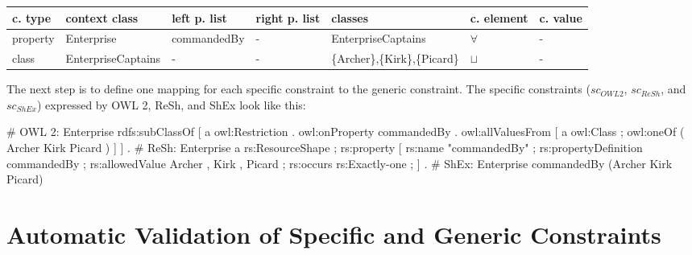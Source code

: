 \documentclass{llncs}
\newcommand{\ms}[1]{\texttt{#1}}
\newenvironment{gcotable}{
  \scriptsize
  \sffamily
  \vspace{0.3cm}
	\begin{center}
  \begin{tabular}{l|l|l|l|l|l|l}
  \hline
  \textbf{c. type} & \textbf{context class} & \textbf{left p. list} & \textbf{right p. list} & \textbf{classes} & \textbf{c. element} & \textbf{c. value} \\
  \hline

}{
  \hline
  \end{tabular}
	\end{center}
}
\begin{document}
\begin{gcotable}
property & Enterprise & commandedBy & - & EnterpriseCaptains & $\forall$ & - \\
class & EnterpriseCaptains & - & - & \{Archer\},\{Kirk\},\{Picard\} & $\sqcup$ & - \\
\end{gcotable}

The next step is to define one mapping for each specific constraint to the generic constraint.
The specific constraints (\ms{$sc_{OWL 2}$}, \ms{$sc_{ReSh}$}, and \ms{$sc_{ShEx}$}) expressed by OWL 2, ReSh, and ShEx look like this:

\begin{ex}
# OWL 2:
Enterprise rdfs:subClassOf [ a owl:Restriction .
    owl:onProperty commandedBy .
    owl:allValuesFrom [ a owl:Class ;
        owl:oneOf ( Archer Kirk Picard ) ] ] .
# ReSh:
Enterprise a rs:ResourceShape ; rs:property [
    rs:name "commandedBy" ; rs:propertyDefinition commandedBy ;
    rs:allowedValue Archer , Kirk , Picard ;
    rs:occurs rs:Exactly-one ; ] .
# ShEx:
Enterprise {
    commandedBy (Archer Kirk Picard) }
\end{ex}


\section{Automatic Validation of Specific and Generic Constraints}
\end{document}
